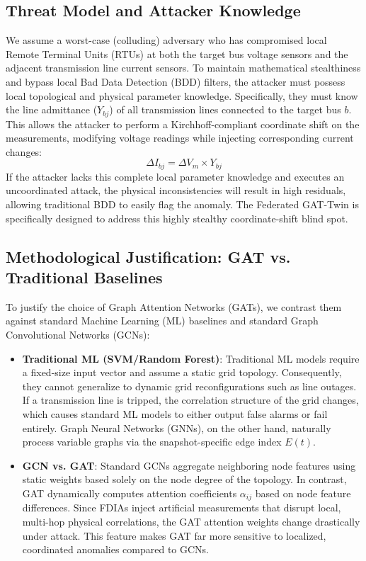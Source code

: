 \documentclass[conference]{IEEEtran}
\begin{document}
\subsection{Threat Model and Attacker Knowledge}
We assume a worst-case (colluding) adversary who has compromised local Remote Terminal Units (RTUs) at both the target bus voltage sensors and the adjacent transmission line current sensors. To maintain mathematical stealthiness and bypass local Bad Data Detection (BDD) filters, the attacker must possess local topological and physical parameter knowledge. Specifically, they must know the line admittance ($Y_{bj}$) of all transmission lines connected to the target bus $b$. This allows the attacker to perform a Kirchhoff-compliant coordinate shift on the measurements, modifying voltage readings while injecting corresponding current changes:
\begin{equation}
\Delta I_{bj} = \Delta V_m \times Y_{bj}
\end{equation}
If the attacker lacks this complete local parameter knowledge and executes an uncoordinated attack, the physical inconsistencies will result in high residuals, allowing traditional BDD to easily flag the anomaly. The Federated GAT-Twin is specifically designed to address this highly stealthy coordinate-shift blind spot.

\subsection{Methodological Justification: GAT vs. Traditional Baselines}
To justify the choice of Graph Attention Networks (GATs), we contrast them against standard Machine Learning (ML) baselines and standard Graph Convolutional Networks (GCNs):
\begin{itemize}
    \item \textbf{Traditional ML (SVM/Random Forest)}: Traditional ML models require a fixed-size input vector and assume a static grid topology. Consequently, they cannot generalize to dynamic grid reconfigurations such as line outages. If a transmission line is tripped, the correlation structure of the grid changes, which causes standard ML models to either output false alarms or fail entirely. Graph Neural Networks (GNNs), on the other hand, naturally process variable graphs via the snapshot-specific edge index $E(t)$.
    \item \textbf{GCN vs. GAT}: Standard GCNs aggregate neighboring node features using static weights based solely on the node degree of the topology. In contrast, GAT dynamically computes attention coefficients $\alpha_{ij}$ based on node feature differences. Since FDIAs inject artificial measurements that disrupt local, multi-hop physical correlations, the GAT attention weights change drastically under attack. This feature makes GAT far more sensitive to localized, coordinated anomalies compared to GCNs.
\end{itemize}
\end{document}
